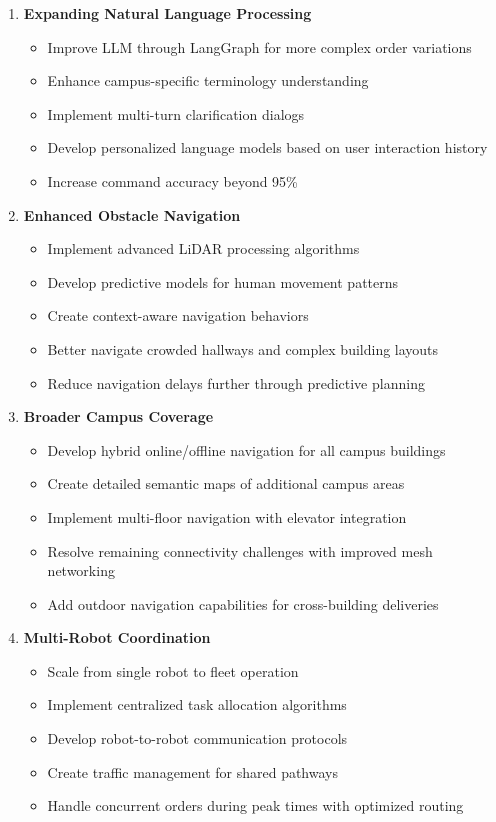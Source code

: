 \documentclass[12pt]{article}
\begin{document}
\begin{enumerate}
    \item \textbf{Expanding Natural Language Processing}
    \begin{itemize}
        \item Improve LLM through LangGraph for more complex order variations
        \item Enhance campus-specific terminology understanding
        \item Implement multi-turn clarification dialogs
        \item Develop personalized language models based on user interaction history
        \item Increase command accuracy beyond 95\%
    \end{itemize}
    
    \item \textbf{Enhanced Obstacle Navigation}
    \begin{itemize}
        \item Implement advanced LiDAR processing algorithms
        \item Develop predictive models for human movement patterns
        \item Create context-aware navigation behaviors
        \item Better navigate crowded hallways and complex building layouts
        \item Reduce navigation delays further through predictive planning
    \end{itemize}
    
    \item \textbf{Broader Campus Coverage}
    \begin{itemize}
        \item Develop hybrid online/offline navigation for all campus buildings
        \item Create detailed semantic maps of additional campus areas
        \item Implement multi-floor navigation with elevator integration
        \item Resolve remaining connectivity challenges with improved mesh networking
        \item Add outdoor navigation capabilities for cross-building deliveries
    \end{itemize}
    
    \item \textbf{Multi-Robot Coordination}
    \begin{itemize}
        \item Scale from single robot to fleet operation
        \item Implement centralized task allocation algorithms
        \item Develop robot-to-robot communication protocols
        \item Create traffic management for shared pathways
        \item Handle concurrent orders during peak times with optimized routing
    \end{itemize}
    

\end{enumerate}
\end{document}
